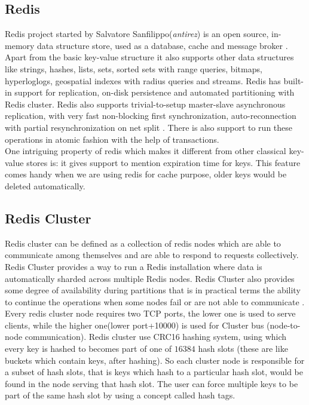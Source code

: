 \documentclass[11pt]{article}
\begin{document}
\subsection*{Redis}
Redis project started by Salvatore Sanfilippo(\textit{antirez}) is
an open source, in-memory data structure store,
used as a database, cache and message broker \cite{redis}.
Apart from the basic key-value structure it also supports other data structures like
strings, hashes, lists, sets, sorted sets with range queries, bitmaps,
hyperloglogs, geospatial indexes with radius queries and streams. Redis has built-in
support for replication, on-disk persistence and automated partitioning with Redis cluster.
Redis also supports trivial-to-setup master-slave asynchronous
replication, with very fast non-blocking first synchronization, auto-reconnection
with partial resynchronization on net split \cite{redis}.
There is also support to run these operations in atomic fashion with the help
of transactions.
\\

One intriguing property of redis which makes it different from other classical key-value
stores is: it gives support to mention expiration time for keys. This feature
comes handy when we are using redis for cache purpose, older keys would be deleted automatically.

\pagebreak

\subsection*{Redis Cluster}
Redis cluster can be defined as a collection of redis nodes which are able to communicate
among themselves and are able to respond to requests collectively.
Redis Cluster provides a way to run a Redis installation where
data is automatically sharded across multiple Redis nodes.
Redis Cluster also provides some degree of availability during partitions
that is in practical terms the ability to continue the operations when
some nodes fail or are not able to communicate \cite{redis}.
\\

Every redis cluster node requires two TCP ports, the lower one is used to serve clients,
while the higher one(lower port+10000) is used for Cluster bus (node-to-node communication).
Redis cluster use CRC16 hashing system, using which every key is hashed to
becomes part of one of $16384$ hash slots (these are like buckets 
which contain keys, after hashing). So each cluster node is
responsible for a subset of hash slots, that is keys which hash to a particular
hash slot, would be found in the node serving that hash slot.
The user can force multiple keys to be part of the same hash slot
by using a concept called hash tags.
\end{document}
